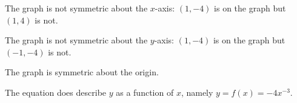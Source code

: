 \documentclass{ximera}
\begin{document}
\begin{multicols}{2}
\begin{enumerate}
\begin{flushleft}
\smallskip

The graph is not symmetric about the $x$-axis: $(1, -4)$ is on the graph but $(1, 4)$ is not. \smallskip

The graph is not symmetric about the $y$-axis:  $(1, -4)$ is on the graph but $(-1, -4)$ is not. \smallskip

The graph is symmetric about the origin. \smallskip

The equation does  describe $y$ as a function of $x$, namely $y=f(x) = - 4x^{-3}$.

\end{flushleft}

\setcounter{HW}{\value{enumi}}
\end{enumerate}
\end{multicols}

\pagebreak
\end{document}
